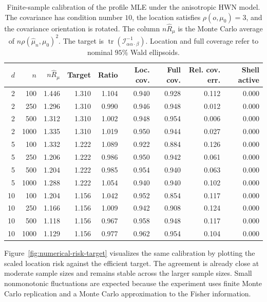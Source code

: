 \documentclass[11pt]{article}
\DeclareMathOperator{\tr}{tr}
\newcommand{\info}{\mathcal{I}}
\begin{document}
\begin{table}[t]
\centering
\caption{Finite-sample calibration of the profile MLE under the anisotropic HWN model. The covariance has condition number \(10\), the location satisfies \(\rho(o,\mu_0)=3\), and the covariance orientation is rotated. The column \(n\hat R_\mu\) is the Monte Carlo average of \(n\rho(\hat\mu_n,\mu_0)^2\). The target is \(\tr(\info_{\alpha\alpha\cdot\beta}^{-1})\). Location and full coverage refer to nominal \(95\%\) Wald ellipsoids.}
\label{tab:numerical-calibration}
\small
\begin{tabular}{rrrrrrrrr}
\toprule
\(d\) & \(n\) & \(n\hat R_\mu\) & Target & Ratio
& Loc. cov. & Full cov. & Rel. cov. err. & Shell active \\
\midrule
2  & 100  & 1.446 & 1.310 & 1.104 & 0.940 & 0.928 & 0.112 & 0.000 \\
2  & 250  & 1.296 & 1.310 & 0.990 & 0.946 & 0.948 & 0.012 & 0.000 \\
2  & 500  & 1.312 & 1.310 & 1.002 & 0.948 & 0.954 & 0.006 & 0.000 \\
2  & 1000 & 1.335 & 1.310 & 1.019 & 0.950 & 0.944 & 0.027 & 0.000 \\
\midrule
5  & 100  & 1.332 & 1.222 & 1.089 & 0.922 & 0.884 & 0.126 & 0.000 \\
5  & 250  & 1.206 & 1.222 & 0.986 & 0.950 & 0.942 & 0.061 & 0.000 \\
5  & 500  & 1.204 & 1.222 & 0.985 & 0.954 & 0.940 & 0.063 & 0.000 \\
5  & 1000 & 1.288 & 1.222 & 1.054 & 0.940 & 0.940 & 0.102 & 0.000 \\
\midrule
10 & 100  & 1.204 & 1.156 & 1.042 & 0.952 & 0.854 & 0.117 & 0.000 \\
10 & 250  & 1.166 & 1.156 & 1.009 & 0.942 & 0.908 & 0.124 & 0.000 \\
10 & 500  & 1.118 & 1.156 & 0.967 & 0.958 & 0.948 & 0.117 & 0.000 \\
10 & 1000 & 1.129 & 1.156 & 0.977 & 0.962 & 0.954 & 0.104 & 0.000 \\
\bottomrule
\end{tabular}
\end{table}

Figure~\ref{fig:numerical-risk-target} visualizes the same calibration by plotting the scaled location risk against the efficient target. The agreement is already close at moderate sample sizes and remains stable across the larger sample sizes. Small nonmonotonic fluctuations are expected because the experiment uses finite Monte Carlo replication and a Monte Carlo approximation to the Fisher information.
\end{document}
